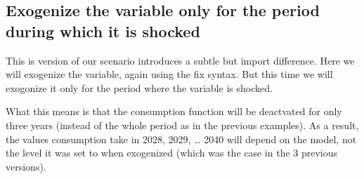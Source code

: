 \documentclass[letterpaper,10pt,english]{jupyterBook}
\begin{document}
\subsection{Exogenize the variable only for the period during which it is shocked}
\label{\detokenize{content/06_WBModels/ScenarioAnalysis:exogenize-the-variable-only-for-the-period-during-which-it-is-shocked}}
\sphinxAtStartPar
This is version of our scenario introduces a subtle but import difference.  Here we will exogenize the variable, again using the fix syntax. But this time we will exogonize it only for the period where the variable is shocked.

\sphinxAtStartPar
What this means is that the consumption function will be de\sphinxhyphen{}actvated for only three years (instead of the whole period as in the previous examples).  As a result, the values consumption take in 2028, 2029, … 2040 will depend on the model, not the level it was set to when exogenized (which was the case in the 3 previous versions).
\end{document}
